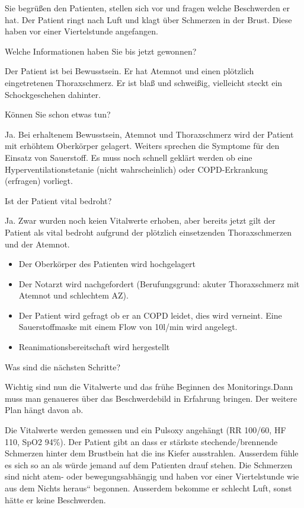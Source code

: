 \documentclass{article}
\begin{document}
Sie begr\"u{\ss}en den Patienten, stellen sich vor und fragen welche
Beschwerden er hat. Der Patient ringt nach Luft und klagt \"uber
Schmerzen in der Brust. Diese haben vor einer Viertelstunde angefangen.


Welche Informationen haben Sie bis jetzt gewonnen?

Der Patient ist bei Bewusstsein. Er hat Atemnot und einen pl\"otzlich
eingetretenen Thoraxschmerz. Er ist bla{\ss} und schwei{\ss}ig,
vielleicht steckt ein Schockgeschehen dahinter. 

K\"onnen Sie schon etwas tun?

Ja.  Bei erhaltenem Bewusstsein, Atemnot und Thoraxschmerz wird der
Patient mit erh\"ohtem Oberk\"orper gelagert. Weiters sprechen die
Symptome f\"ur den Einsatz von Sauerstoff. Es muss noch schnell
gekl\"art werden ob eine Hyperventilationstetanie (nicht
wahrscheinlich) oder COPD-Erkrankung (erfragen) vorliegt. 

Ist der Patient vital bedroht?

Ja. Zwar wurden noch keien Vitalwerte erhoben, aber bereits jetzt gilt
der Patient als vital bedroht aufgrund der pl\"otzlich einsetzenden
Thoraxschmerzen und der Atemnot. 

\begin{itemize}
\item Der Oberk\"orper des Patienten wird hochgelagert 

\item Der Notarzt wird nachgefordert (Berufungsgrund: akuter
Thoraxschmerz mit Atemnot und schlechtem AZ).

\item Der Patient wird gefragt ob er an COPD leidet, dies wird verneint.
Eine Sauerstoffmaske mit einem Flow von 10l/min wird angelegt. 

\item Reanimationsbereitschaft wird hergestellt

\end{itemize}
Was sind die n\"achsten Schritte?

Wichtig sind nun die Vitalwerte und das fr\"uhe Beginnen des
Monitorings.Dann muss man genaueres \"uber das Beschwerdebild in
Erfahrung bringen. Der weitere Plan h\"angt davon ab.

Die Vitalwerte werden gemessen und ein Pulsoxy angeh\"angt (RR 100/60,
HF 110, SpO2 94\%). Der Patient gibt an dass er st\"arkste
stechende/brennende Schmerzen hinter dem Brustbein hat die ins Kiefer
ausstrahlen. Ausserdem f\"uhle es sich so an als w\"urde jemand auf dem
Patienten drauf stehen. Die Schmerzen sind nicht atem- oder
bewegungsabh\"angig  und haben vor einer Viertelstunde
{\quotedblbase}wie aus dem Nichts heraus{\textquotedblleft} begonnen.
Ausserdem bekomme er schlecht Luft, sonst h\"atte er keine Beschwerden.
\end{document}
